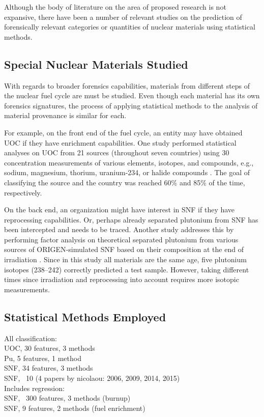 Although the body of literature on the area of proposed research is not
expansive, there have been a number of relevant studies on the prediction of
forensically relevant categories or quantities of nuclear materials using
statistical methods. 

\subsection{Special Nuclear Materials Studied}

With regards to broader forensics capabilities, materials from different steps
of the nuclear fuel cycle are must be studied.  Even though each material has
its own forensics signatures, the process of applying statistical methods to
the analysis of material provenance is similar for each. 

For example, on the front end of the fuel cycle, an entity may have obtained
\gls{UOC} if they have enrichment capabilities.  One study performed
statistical analyses on \gls{UOC} from 21 sources (throughout seven countries)
using 30 concentration measurements of various elements, isotopes, and
compounds, e.g., sodium, magnesium, thorium, uranium-234, or halide compounds
\cite{robel_2009}.  The goal of classifying the source and the country was
reached 60\% and 85\% of the time, respectively. 

On the back end, an organization might have interest in \gls{SNF} if they have
reprocessing capabilities.  Or, perhaps already separated plutonium from
\gls{SNF} has been intercepted and needs to be traced. Another study addresses
this by performing factor analysis on theoretical separated plutonium from
various sources of \gls{ORIGEN}-simulated \gls{SNF} based on their composition
at the end of irradiation \cite{nicolaou_pu}.  Since in this study all
materials are the same age, five plutonium isotopes (238--242) correctly
predicted a test sample. However, taking different times since irradiation and
reprocessing into account requires more isotopic measurements. 

\subsection{Statistical Methods Employed}

All classification:\\
UOC, 30 features, 3 methods \cite{robel_2009}\\
Pu, 5 features, 1 method \cite{nicolaou_pu}\\
SNF, 34 features, 3 methods \cite{jones_snf_2014}\\
SNF, ~10 (4 papers by nicolaou: 2006, 2009, 2014, 2015)\\

Includes regression:\\
SNF, ~300 features, 3 methods \cite{dayman_feasibility_2013} (burnup)\\
SNF, 9 features, 2 methods \cite{pu_discrimination} (fuel enrichment)\\


